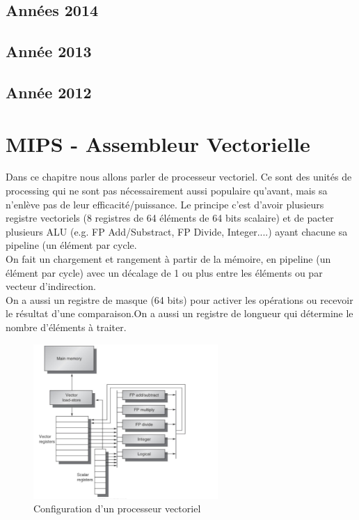 \documentclass[oneside]{book}
\begin{document}

\section{Années 2014}

\section{Année 2013}

\section{Année 2012}


\chapter{MIPS - Assembleur Vectorielle}
Dans ce chapitre nous allons parler de processeur vectoriel. Ce sont des unités de processing qui ne sont pas nécessairement aussi populaire qu'avant, mais sa n'enlève pas de leur efficacité/puissance. Le principe c'est d'avoir plusieurs registre vectoriels (8 registres de 64 éléments de 64 bits scalaire) et de pacter plusieurs ALU (e.g. FP Add/Substract, FP Divide, Integer....) ayant chacune sa pipeline (un élément par cycle.\\

On fait un chargement et rangement à partir de la mémoire, en pipeline (un élément par cycle) avec un décalage de 1 ou plus entre les éléments ou par vecteur d'indirection.\\

On a aussi un registre de masque (64 bits) pour activer les opérations ou recevoir le résultat d'une comparaison.On a aussi un registre de longueur qui détermine le nombre d'éléments à traiter.\\

\begin{figure}[!ht]
\centering
\includegraphics[width = 7cm]{processeur_vectoriel.png}
\caption{Configuration d'un processeur vectoriel}
\label{fig:layout_vectoriel}
\end{figure}
\end{document}
